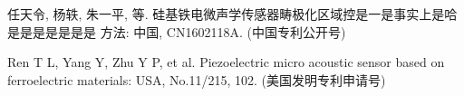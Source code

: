 \begin{resume}
  \begin{achievements}
    \item 任天令, 杨轶, 朱一平, 等. 硅基铁电微声学传感器畴极化区域控是一是事实上是哈是是是是是是是
      方法: 中国, CN1602118A. (中国专利公开号)
    \item Ren T L, Yang Y, Zhu Y P, et al. Piezoelectric micro acoustic sensor
      based on ferroelectric materials: USA, No.11/215, 102. (美国发明专利申请号)
  \end{achievements}

\end{resume}
